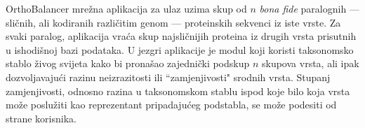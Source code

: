 OrthoBalancer mrežna aplikacija za ulaz uzima skup od $n$ \emph{bona fide}
paralognih --- sličnih, ali kodiranih različitim genom --- proteinskih sekvenci
iz iste vrste. Za svaki paralog, aplikacija vraća skup najsličnijih proteina iz
drugih vrsta prisutnih u ishodišnoj bazi podataka. U jezgri aplikacije je modul
koji koristi taksonomsko stablo živog svijeta kako bi pronašao zajednički
podskup $n$ skupova vrsta, ali ipak dozvoljavajući razinu neizrazitosti ili
``zamjenjivosti" srodnih vrsta. Stupanj zamjenjivosti, odnosno razina u
taksonomskom stablu ispod koje bilo koja vrsta može poslužiti kao reprezentant
pripadajućeg podstabla, se može podesiti od strane korisnika.
